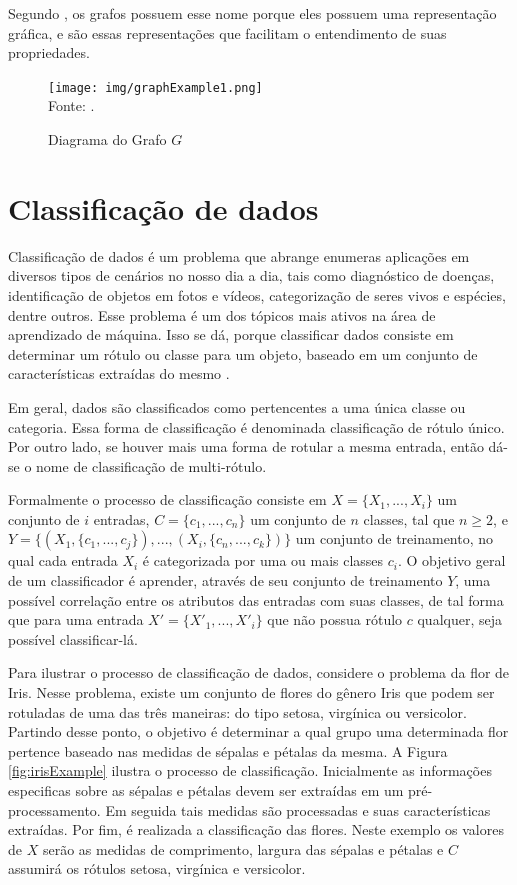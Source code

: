 Segundo \cite{Bondy1976}, os grafos possuem esse nome porque eles possuem uma representação gráfica, e são essas representações que facilitam o entendimento de suas propriedades.

\begin{figure}[ht!]
\caption{Diagrama do Grafo $G$}
\label{fig:graphExample1}
\centering
\texttt{[image: img/graphExample1.png]}
{\fontsize{11pt}{\baselineskip}\selectfont
\\Fonte: \cite{graphOnline}.
}
\end{figure}

\section{Classificação de dados}
Classificação de dados é um problema que abrange enumeras aplicações em diversos tipos de cenários no nosso dia a dia, tais como diagnóstico de doenças, identificação de objetos em fotos e vídeos, categorização de seres vivos e espécies, dentre outros. Esse problema é um dos tópicos mais ativos na área de aprendizado de máquina. Isso se dá, porque classificar dados consiste em determinar um rótulo ou classe para um objeto, baseado em um conjunto de características extraídas do mesmo \citep{duda1973pattern,bishop2006pattern}. 

Em geral, dados são classificados como pertencentes a uma única classe ou categoria. Essa forma de classificação é denominada classificação de rótulo único. Por outro lado, se houver mais uma forma de rotular a mesma entrada, então dá-se o nome de classificação de multi-rótulo. 

Formalmente o processo de classificação consiste em $X = \{X_1,...,X_i\}$ um conjunto de $i$ entradas, $C = \{c_1,...,c_n\}$ um conjunto de $n$ classes, tal que $n \geq 2$, e $Y = \{(X_1, \{c_1,...,c_j\}),...,(X_i, \{c_n,...,c_k\})\}$ um conjunto de treinamento, no qual cada entrada $X_i$ é categorizada por uma ou mais classes $c_i$. O objetivo geral de um classificador é aprender, através de seu conjunto de treinamento $Y$, uma possível correlação entre os atributos das entradas com suas classes, de tal forma que para uma entrada $X' = \{X'_1,...,X'_i\}$ que não possua rótulo $c$ qualquer, seja possível classificar-lá.

Para ilustrar o processo de classificação de dados, considere o problema da flor de Iris. Nesse problema, existe um conjunto de flores do gênero Iris que podem ser rotuladas de uma das três maneiras: do tipo setosa, virgínica ou versicolor. Partindo desse ponto, o objetivo é determinar a qual grupo uma determinada flor pertence baseado nas medidas de sépalas e pétalas da mesma. A Figura \ref{fig:irisExample} ilustra o processo de classificação. Inicialmente as informações especificas sobre as sépalas e pétalas devem ser extraídas em um pré-processamento. Em seguida tais medidas são processadas e suas características extraídas. Por fim, é realizada a classificação das flores. Neste exemplo os valores de $X$ serão as medidas de comprimento, largura das sépalas e pétalas e $C$ assumirá os rótulos setosa, virgínica e versicolor.

